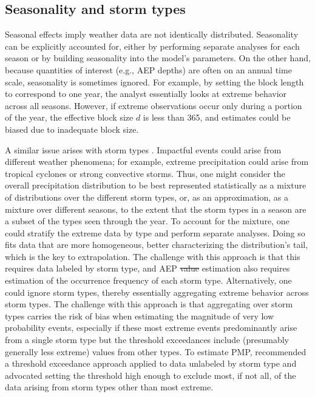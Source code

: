 \documentclass{ametsocV6.1}
\providecommand{\DIFdel}[1]{{\protect\color{red}\sout{#1}}}                      %
\providecommand{\DIFdelbegin}{} %
\providecommand{\DIFdelend}{} %
\newcommand{\DIFscaledelfig}{0.5}
\newlength{\DIFdelgraphicswidth} %
\newlength{\DIFdelgraphicsheight} %
\newcommand{\DIFdelincludegraphics}[2][]{%
\sbox{\DIFdelgraphicsbox}{\DIFOincludegraphics[#1]{#2}}%
\settoboxwidth{\DIFdelgraphicswidth}{\DIFdelgraphicsbox} %
\settoboxtotalheight{\DIFdelgraphicsheight}{\DIFdelgraphicsbox} %
\scalebox{\DIFscaledelfig}{%
\parbox[b]{\DIFdelgraphicswidth}{\usebox{\DIFdelgraphicsbox}\\[-\baselineskip] \rule{\DIFdelgraphicswidth}{0em}}\llap{\resizebox{\DIFdelgraphicswidth}{\DIFdelgraphicsheight}{%
\setlength{\unitlength}{\DIFdelgraphicswidth}%
\begin{picture}(1,1)%
\thicklines\linethickness{2pt} %
{\color[rgb]{1,0,0}\put(0,0){\framebox(1,1){}}}%
{\color[rgb]{1,0,0}\put(0,0){\line( 1,1){1}}}%
{\color[rgb]{1,0,0}\put(0,1){\line(1,-1){1}}}%
\end{picture}%
}\hspace*{3pt}}} %
} %
\DeclareRobustCommand{\DIFdelbegin}{\DIFOdelbegin \let\includegraphics\DIFdelincludegraphics} %
\DeclareRobustCommand{\DIFdelend}{\DIFOaddend \let\includegraphics\DIFOincludegraphics} %
\begin{document}
\subsection{Seasonality and storm types}


Seasonal effects imply weather data are not identically distributed.
Seasonality can be explicitly accounted for, either by performing separate analyses for each season or by building seasonality into the model's parameters.
On the other hand, because quantities of interest (e.g., AEP depths) are often on an annual time scale, seasonality is sometimes ignored.
For example, by setting the block length to correspond to one year, the analyst essentially looks at extreme behavior across all seasons.
However, if extreme observations occur only during a portion of the year, the effective block size $d$ is less than 365, and estimates could be biased due to inadequate block size.

A similar issue arises with storm types \citep{nasem2024pmp}.
Impactful events could arise from different weather phenomena; for example, extreme precipitation could arise from tropical cyclones or strong convective storms. 
Thus, one might consider the overall precipitation distribution to be best represented statistically as a mixture of distributions over the different storm types, or, as an approximation, as a mixture over different seasons, to the extent that the storm types in a season are a subset of the types seen through the year.
To account for the mixture, one could stratify the extreme data by type and perform separate analyses. 
Doing so fits data that are more homogeneous, better characterizing the distribution's tail, which is the key to extrapolation. 
The challenge with this approach is that this requires data labeled by storm type, and AEP \DIFdelbegin \DIFdel{value }\DIFdelend estimation also requires estimation of the occurrence frequency of each storm type.
Alternatively, one could ignore storm types, thereby essentially aggregating extreme behavior across storm types.
The challenge with this approach is that aggregating over storm types carries the risk of bias when estimating the magnitude of very low probability events, especially if these most extreme events predominantly arise from a single storm type but the threshold exceedances include (presumably generally less extreme) values from other types.
To estimate PMP, \citet{nasem2024pmp} recommended a threshold exceedance approach applied to data unlabeled by storm type and advocated setting the threshold high enough to exclude most, if not all, of the data arising from storm types other than most extreme.
\end{document}
